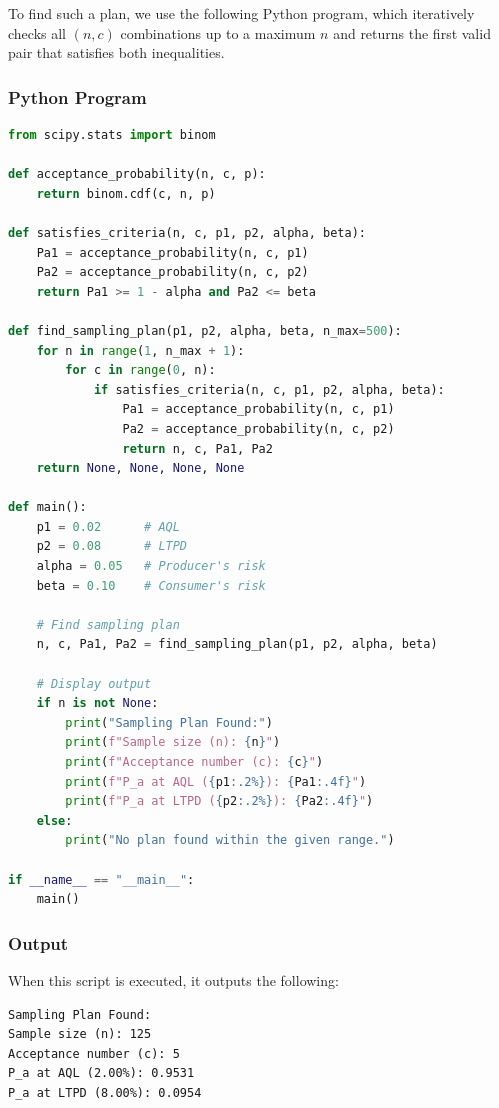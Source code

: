 \documentclass[twoside]{book}
\begin{document}
To find such a plan, we use the following Python program, which iteratively checks all $(n, c)$ combinations up to a maximum $n$ and returns the first valid pair that satisfies both inequalities.

\subsubsection{Python Program}

\begin{lstlisting}[language=Python]
from scipy.stats import binom

def acceptance_probability(n, c, p):
    return binom.cdf(c, n, p)

def satisfies_criteria(n, c, p1, p2, alpha, beta):
    Pa1 = acceptance_probability(n, c, p1)
    Pa2 = acceptance_probability(n, c, p2)
    return Pa1 >= 1 - alpha and Pa2 <= beta

def find_sampling_plan(p1, p2, alpha, beta, n_max=500):
    for n in range(1, n_max + 1):
        for c in range(0, n):
            if satisfies_criteria(n, c, p1, p2, alpha, beta):
                Pa1 = acceptance_probability(n, c, p1)
                Pa2 = acceptance_probability(n, c, p2)
                return n, c, Pa1, Pa2
    return None, None, None, None

def main():
    p1 = 0.02      # AQL
    p2 = 0.08      # LTPD
    alpha = 0.05   # Producer's risk
    beta = 0.10    # Consumer's risk

    # Find sampling plan
    n, c, Pa1, Pa2 = find_sampling_plan(p1, p2, alpha, beta)

    # Display output
    if n is not None:
        print("Sampling Plan Found:")
        print(f"Sample size (n): {n}")
        print(f"Acceptance number (c): {c}")
        print(f"P_a at AQL ({p1:.2%}): {Pa1:.4f}")
        print(f"P_a at LTPD ({p2:.2%}): {Pa2:.4f}")
    else:
        print("No plan found within the given range.")

if __name__ == "__main__":
    main()
\end{lstlisting}

\subsubsection*{Output}
When this script is executed, it outputs the following:

\begin{lstlisting}
Sampling Plan Found:
Sample size (n): 125
Acceptance number (c): 5
P_a at AQL (2.00%): 0.9531
P_a at LTPD (8.00%): 0.0954
\end{lstlisting}
\end{document}
